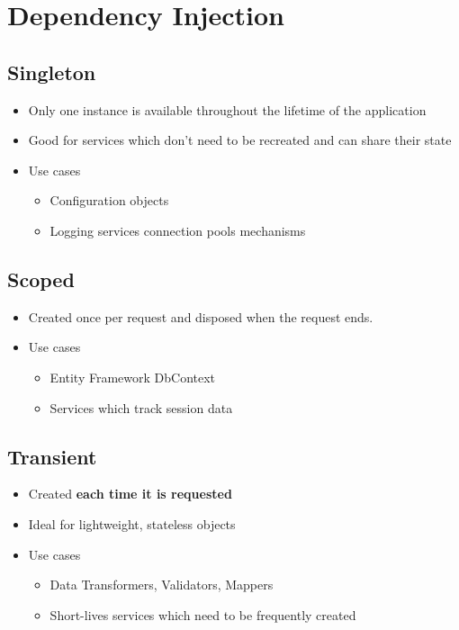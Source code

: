 \chapter{Dependency Injection}

\section{Singleton}
	\begin{itemize}
		\item Only one instance is available throughout the lifetime of the application
		\item Good for services which don't need to be recreated and can share their state
		\item Use cases
		\begin{itemize}
			\item Configuration objects
			\item Logging services
			\Database connection pools
			\Caching mechanisms
		\end{itemize}
	\end{itemize}
\section{Scoped}
	\begin{itemize}
		\item Created once per request and disposed when the request ends.
		\item Use cases
		\begin{itemize}
			\item Entity Framework DbContext
			\item Services which track session data
		\end{itemize}
	\end{itemize}
\section{Transient}
	\begin{itemize}
		\item Created \textbf{each time it is requested}
		\item Ideal for lightweight, stateless objects
		\item Use cases
		\begin{itemize}
			\item Data Transformers, Validators, Mappers
			\item Short-lives services which need to be frequently created
		\end{itemize}
	\end{itemize}